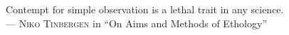 \vspace*{5cm}
\makeatletter
\begin{center}
  Contempt for simple observation is a lethal trait in any science.\\[0.5cm]
  — \textsc{Niko Tinbergen} in \enquote{On Aims and Methods of Ethology}\\
  \vfill
\end{center}
\makeatother
